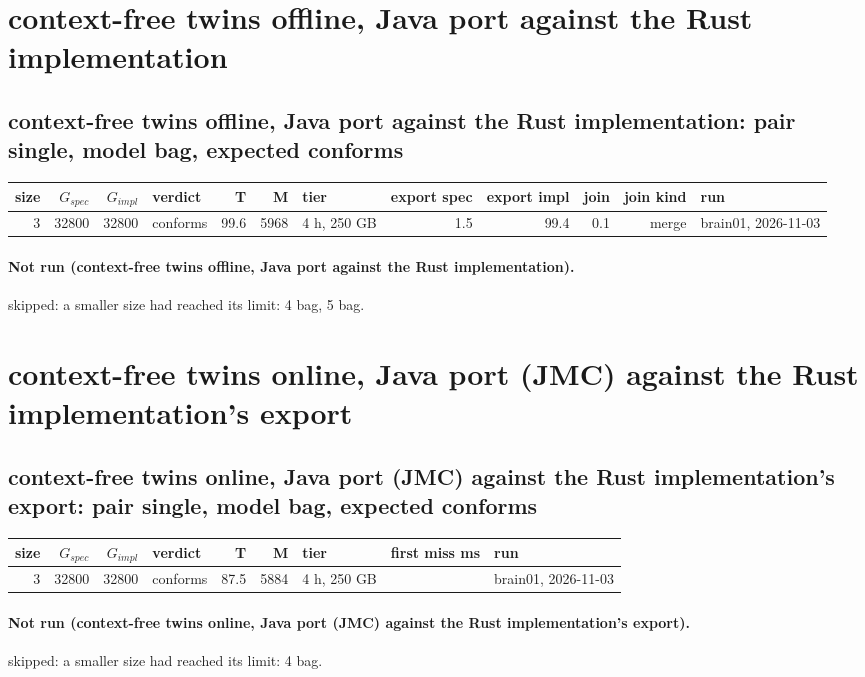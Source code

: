 \documentclass[10pt]{article}
\begin{document}
\section*{context-free twins offline, Java port against the Rust implementation}
\subsection*{context-free twins offline, Java port against the Rust implementation: pair \textsf{single}, model bag, expected conforms}
\begin{longtable}{@{}rrrlrrlrrrrl@{}}
\toprule
size & $G_{\mathit{spec}}$ & $G_{\mathit{impl}}$ & verdict & T & M & tier & export spec & export impl & join & join kind & run \\
\midrule
\endhead
\color{blue} 3 & 32800 & 32800 & conforms & 99.6 & 5968 & 4 h, 250 GB & 1.5 & 99.4 & 0.1 & merge & brain01, 2026-11-03 \\
\bottomrule
\end{longtable}
\paragraph{Not run (context-free twins offline, Java port against the Rust implementation).}
skipped: a smaller size had reached its limit: 4 bag, 5 bag.\par
\section*{context-free twins online, Java port (JMC) against the Rust implementation's export}
\subsection*{context-free twins online, Java port (JMC) against the Rust implementation's export: pair \textsf{single}, model bag, expected conforms}
\begin{longtable}{@{}rrrlrrlrl@{}}
\toprule
size & $G_{\mathit{spec}}$ & $G_{\mathit{impl}}$ & verdict & T & M & tier & first miss ms & run \\
\midrule
\endhead
\color{blue} 3 & 32800 & 32800 & conforms & 87.5 & 5884 & 4 h, 250 GB &  & brain01, 2026-11-03 \\
\bottomrule
\end{longtable}
\paragraph{Not run (context-free twins online, Java port (JMC) against the Rust implementation's export).}
skipped: a smaller size had reached its limit: 4 bag.\par
\end{document}
